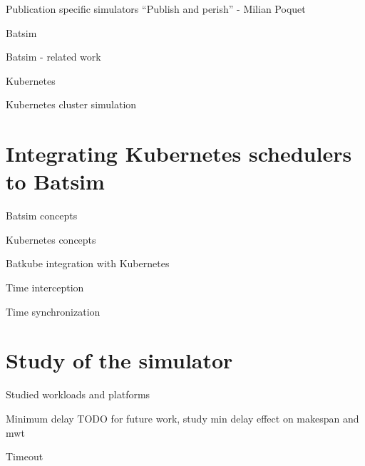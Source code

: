 \documentclass[12pt, aspectratio=43]{beamer}
\begin{document}
\begin{frame}{Publication specific simulators}
	``Publish and perish'' - Milian Poquet
\end{frame}

\begin{frame}{Batsim}
\end{frame}

\begin{frame}{Batsim - related work}
\end{frame}

\begin{frame}{Kubernetes}
\end{frame}

\begin{frame}{Kubernetes cluster simulation}
\end{frame}

\section{Integrating Kubernetes schedulers to Batsim}
\begin{frame}{Batsim concepts}
\end{frame}

\begin{frame}{Kubernetes concepts}
\end{frame}

\begin{frame}{Batkube integration with Kubernetes}
\end{frame}

\begin{frame}{Time interception}
\end{frame}

\begin{frame}{Time synchronization}
\end{frame}

\section{Study of the simulator}
\begin{frame}{Studied workloads and platforms}
\end{frame}

\begin{frame}{Minimum delay}
	TODO for future work, study min delay effect on makespan and mwt
\end{frame}

\begin{frame}{Timeout}
\end{frame}
\end{document}
